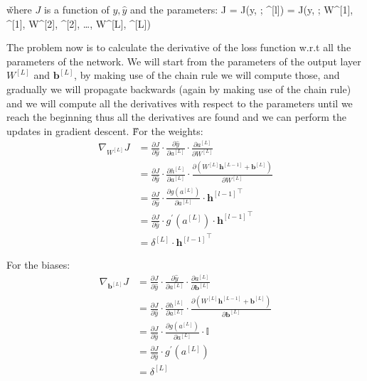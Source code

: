 \v

where $J$ is a function of $y, \hat{y}$ and the parameters:
\bse
J = J(y,  ; \theta^{[l]}) = J(y,  ; W^{[1]}, ^{[1]}, W^{[2]}, ^{[2]},
\ldots, W^{[L]}, ^{[L]})
\ese

The problem now is to calculate the derivative of the loss function w.r.t all the parameters of the network. We will
start from the parameters of the output layer $W^{[L]}$ and $\boldsymbol{b}^{[L]}$, by making use of the chain rule
we will compute those, and gradually we will propagate backwards (again by making use of the chain rule) and we will
compute all the derivatives with respect to the parameters until we reach the beginning thus all the derivatives are
found and we can perform the updates in gradient descent. \v

For the weights:
{\setlength{\jot}{5pt}
\begin{align*}
\nabla_{W^{[L]}} J & = \frac{\partial J}{\partial \hat{y}} \cdot \frac{\partial \hat{y}}{\partial a^{[L]}} \cdot
\frac{\partial a^{[L]}}{\partial W^{[L]}} \\
& = \frac{\partial J}{\partial \hat{y}} \cdot \frac{\partial h^{[L]}}{\partial a^{[L]}}
\cdot \frac{\partial \left( W^{[L]} \boldsymbol{h}^{[L-1]} + \boldsymbol{b}^{[L]} \right)}{\partial W^{[L]}} \\
& = \frac{\partial J}{\partial \hat{y}} \cdot \frac{\partial g(a^{[L]})}{\partial a^{[L]}}
\cdot {\boldsymbol{h}^{[l-1]}}^{\intercal} \\
& = \frac{\partial J}{\partial \hat{y}} \cdot g^\prime (a^{[L]}) \cdot {\boldsymbol{h}^{[l-1]}}^{\intercal}\\
& = \delta^{[L]} \cdot {\boldsymbol{h}^{[l-1]}}^{\intercal}
\end{align*}}

For the biases:
\begingroup
\allowdisplaybreaks
{\setlength{\jot}{5pt}
\begin{align*}
\nabla_{\boldsymbol{b}^{[L]}} J & = \frac{\partial J}{\partial\hat{y}}
\cdot \frac{\partial \hat{y}}{\partial a^{[L]}} \cdot \frac{\partial a^{[L]}}{\partial \boldsymbol{b}^{[L]}} \\
& = \frac{\partial J}{\partial \hat{y}} \cdot \frac{\partial h^{[L]}}{\partial a^{[L]}}
\cdot \frac{\partial \left( W^{[L]} \boldsymbol{h}^{[L-1]} + \boldsymbol{b}^{[L]} \right)}{\partial
\boldsymbol{b}^{[L]}} \\
& = \frac{\partial J}{\partial \hat{y}} \cdot \frac{\partial g(a^{[L]})}{\partial a^{[L]}} \cdot \mathbb{I} \\
& = \frac{\partial J}{\partial \hat{y}} \cdot g^\prime (a^{[L]}) \\
& = \delta^{[L]}
\end{align*}}
\endgroup

